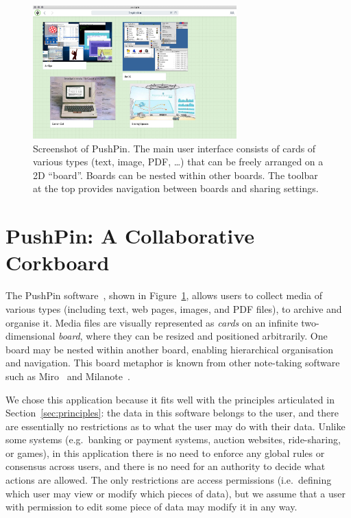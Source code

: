 \documentclass[sigplan,10pt]{acmart}
\begin{document}
\begin{figure}
    \centering
    \includegraphics[width=0.7\textwidth]{pushpin.jpg}
    \caption{Screenshot of PushPin. The main user interface consists of cards of various types (text, image, PDF, \dots) that can be freely arranged on a 2D ``board''. Boards can be nested within other boards. The toolbar at the top provides navigation between boards and sharing settings.}
    \label{fig:pushpin}
\end{figure}

\section{PushPin: A Collaborative Corkboard}\label{sec:pushpin}

The PushPin software~\cite{PushPinSource}, shown in Figure~\ref{fig:pushpin}, allows users to collect media of various types (including text, web pages, images, and PDF files), to archive and organise it.
Media files are visually represented as \emph{cards} on an infinite two-dimensional \emph{board}, where they can be resized and positioned arbitrarily.
One board may be nested within another board, enabling hierarchical organisation and navigation.
This board metaphor is known from other note-taking software such as Miro~\cite{Miro} and Milanote~\cite{Milanote}.

We chose this application because it fits well with the principles articulated in Section~\ref{sec:principles}: the data in this software belongs to the user, and there are essentially no restrictions as to what the user may do with their data.
Unlike some systems (e.g.\ banking or payment systems, auction websites, ride-sharing, or games), in this application there is no need to enforce any global rules or consensus across users, and there is no need for an authority to decide what actions are allowed.
The only restrictions are access permissions (i.e.\ defining which user may view or modify which pieces of data), but we assume that a user with permission to edit some piece of data may modify it in any way.
\end{document}
